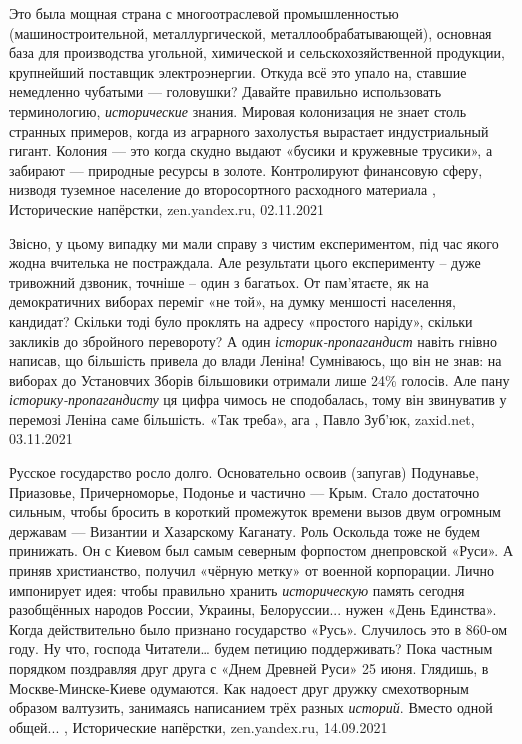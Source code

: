 Это была мощная страна с многоотраслевой промышленностью (машиностроительной,
металлургической, металлообрабатывающей), основная база для производства
угольной, химической и сельскохозяйственной продукции, крупнейший поставщик
электроэнергии. Откуда всё это упало на, ставшие немедленно чубатыми —
головушки?  Давайте правильно использовать терминологию, \emph{исторические} знания.
Мировая колонизация не знает столь странных примеров, когда из аграрного
захолустья вырастает индустриальный гигант. Колония — это когда скудно выдают
«бусики и кружевные трусики», а забирают — природные ресурсы в золоте.
Контролируют финансовую сферу, низводя туземное население до второсортного
расходного материала
, 
Исторические напёрстки, zen.yandex.ru, 02.11.2021

Звісно, у цьому випадку ми мали справу з чистим експериментом, під час якого
жодна вчителька не постраждала. Але результати цього експерименту – дуже
тривожний дзвоник, точніше – один з багатьох. От пам'ятаєте, як на
демократичних виборах переміг «не той», на думку меншості населення, кандидат?
Скільки тоді було проклять на адресу «простого наріду», скільки закликів до
збройного перевороту? А один \emph{історик-пропагандист} навіть гнівно написав, що
більшість привела до влади Леніна! Сумніваюсь, що він не знав: на виборах до
Установчих Зборів більшовики отримали лише 24\% голосів. Але пану
\emph{історику-пропагандисту} ця цифра чимось не сподобалась, тому він звинуватив у
перемозі Леніна саме більшість. «Так треба», ага
, Павло Зуб'юк, zaxid.net, 03.11.2021

Русское государство росло долго. Основательно освоив (запугав) Подунавье,
Приазовье, Причерноморье, Подонье и частично — Крым. Стало достаточно сильным,
чтобы бросить в короткий промежуток времени вызов двум огромным державам —
Византии и Хазарскому Каганату. Роль Оскольда тоже не будем принижать. Он с
Киевом был самым северным форпостом днепровской «Руси». А приняв христианство,
получил «чёрную метку» от военной корпорации.  Лично импонирует идея: чтобы
правильно хранить \emph{историческую} память сегодня разобщённых народов России,
Украины, Белоруссии... нужен «День Единства». Когда действительно было признано
государство «Русь». Случилось это в 860-ом году. Ну что, господа Читатели…
будем петицию поддерживать? Пока частным порядком поздравляя друг друга с «Днем
Древней Руси» 25 июня. Глядишь, в Москве-Минске-Киеве одумаются. Как надоест
друг дружку смехотворным образом валтузить, занимаясь написанием трёх разных
\emph{историй}. Вместо одной общей...
, 
Исторические напёрстки, zen.yandex.ru, 14.09.2021

